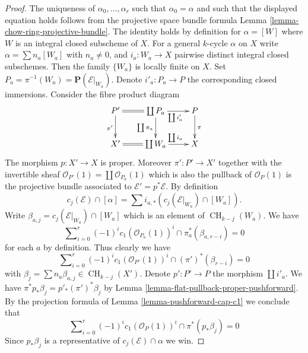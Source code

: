 \documentclass[10pt,a4paper]{amsart}
\theoremstyle{plain}
\theoremstyle{definition}
\theoremstyle{remark}
\numberwithin{equation}{subsection}
\def\CH{\mathop{\mathrm{CH}}\nolimits}
\begin{document}
\begin{proof}
The uniqueness of $\alpha_0, \ldots, \alpha_r$ such that
$\alpha_0 = \alpha$ and such that
the displayed equation holds follows from
the projective space bundle formula
Lemma \ref{lemma-chow-ring-projective-bundle}.
The identity holds by definition for $\alpha = [W]$ where $W$
is an integral closed subscheme of $X$.
For a general $k$-cycle $\alpha$ on $X$ write
$\alpha = \sum n_a[W_a]$ with $n_a \not = 0$, and
$i_a : W_a \to X$ pairwise distinct integral closed subschemes.
Then the family $\{W_a\}$ is locally finite on $X$.
Set $P_a = \pi^{-1}(W_a) = \mathbf{P}(\mathcal{E}|_{W_a})$.
Denote $i'_a : P_a \to P$ the corresponding closed immersions.
Consider the fibre product diagram
$$
\xymatrix{
P' \ar@{=}[r] \ar[d]_{\pi'} &
\coprod P_a \ar[d]_{\coprod \pi_a} \ar[r]_{\coprod i'_a} &
P \ar[d]^\pi \\
X' \ar@{=}[r] &
\coprod W_a \ar[r]^{\coprod i_a} &
X
}
$$
The morphism $p : X' \to X$ is proper. Moreover
$\pi' : P' \to X'$ together with the invertible sheaf
$\mathcal{O}_{P'}(1) = \coprod \mathcal{O}_{P_a}(1)$
which is also the pullback of $\mathcal{O}_P(1)$
is the projective bundle associated to
$\mathcal{E}' = p^*\mathcal{E}$. By definition
$$
c_j(\mathcal{E}) \cap [\alpha]
=
\sum i_{a, *}(c_j(\mathcal{E}|_{W_a}) \cap [W_a]).
$$
Write $\beta_{a, j} = c_j(\mathcal{E}|_{W_a}) \cap [W_a]$
which is an element of $\CH_{k - j}(W_a)$. We have
$$
\sum\nolimits_{i = 0}^r
(-1)^i c_1(\mathcal{O}_{P_a}(1))^i \cap \pi_a^*(\beta_{a, r - i}) = 0
$$
for each $a$ by definition. Thus clearly we have
$$
\sum\nolimits_{i = 0}^r
(-1)^i c_1(\mathcal{O}_{P'}(1))^i \cap (\pi')^*(\beta_{r - i}) = 0
$$
with $\beta_j = \sum n_a\beta_{a, j} \in \CH_{k - j}(X')$. Denote
$p' : P' \to P$ the morphism $\coprod i'_a$.
We have $\pi^*p_*\beta_j = p'_*(\pi')^*\beta_j$
by Lemma \ref{lemma-flat-pullback-proper-pushforward}.
By the projection formula of Lemma \ref{lemma-pushforward-cap-c1}
we conclude that
$$
\sum\nolimits_{i = 0}^r
(-1)^i c_1(\mathcal{O}_P(1))^i \cap \pi^*(p_*\beta_j) = 0
$$
Since $p_*\beta_j$ is a representative of $c_j(\mathcal{E}) \cap \alpha$
we win.
\end{proof}
\end{document}
